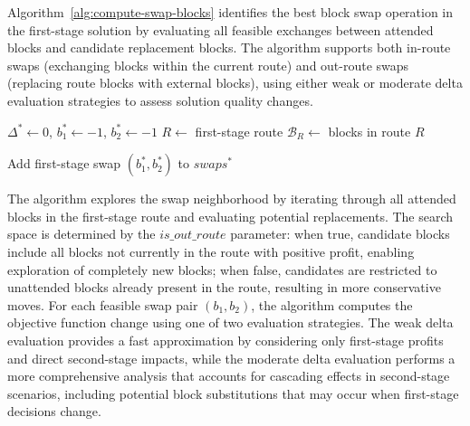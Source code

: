 Algorithm~\ref{alg:compute-swap-blocks} identifies the best block swap operation in the first-stage solution by evaluating all feasible exchanges between attended blocks and candidate replacement blocks. The algorithm supports both in-route swaps (exchanging blocks within the current route) and out-route swaps (replacing route blocks with external blocks), using either weak or moderate delta evaluation strategies to assess solution quality changes.

\begin{algorithm}[h!]
	\caption{Compute Swap Blocks} \label{alg:compute-swap-blocks}
	\SetAlgoLined

	$\Delta^* \leftarrow 0$, $b_1^* \leftarrow -1$, $b_2^* \leftarrow -1$\;
	$R \leftarrow$ first-stage route\;
	$\mathcal{B}_R \leftarrow$ blocks in route $R$\;

	Add first-stage swap $(b_1^*, b_2^*)$ to $swaps^*$\;
	\;
\end{algorithm}

The algorithm explores the swap neighborhood by iterating through all attended blocks in the first-stage route and evaluating potential replacements. The search space is determined by the $is\_out\_route$ parameter: when true, candidate blocks include all blocks not currently in the route with positive profit, enabling exploration of completely new blocks; when false, candidates are restricted to unattended blocks already present in the route, resulting in more conservative moves. For each feasible swap pair $(b_1, b_2)$, the algorithm computes the objective function change using one of two evaluation strategies. The weak delta evaluation provides a fast approximation by considering only first-stage profits and direct second-stage impacts, while the moderate delta evaluation performs a more comprehensive analysis that accounts for cascading effects in second-stage scenarios, including potential block substitutions that may occur when first-stage decisions change.

